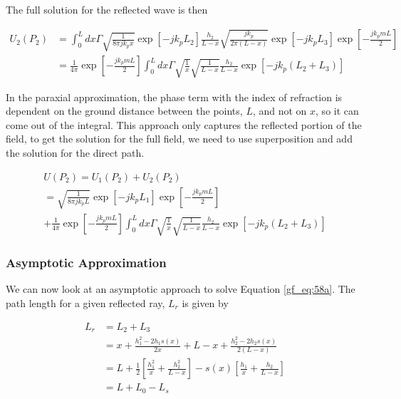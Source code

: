 \noindent The full solution for the reflected wave is then 

\begin{equation}
\begin{aligned}
U_2(P_2) &= \int_0^L dx \Gamma \sqrt{\frac{1}{8\pi j k_p x}}\exp[-jk_pL_2]\frac{h_2}{L-x}\sqrt{\frac{jk_p}{2\pi(L-x)}}\exp[-jk_pL_3]\exp\left[-\frac{jk_pmL}{2}\right]\\
&= \frac{1}{4\pi}\exp\left[-\frac{jk_pmL}{2}\right]\int_0^L dx \Gamma \sqrt{\frac{1}{x}}\sqrt{\frac{1}{L-x}}\frac{h_2}{L-x}\exp\left[-jk_p\left(L_2+L_3\right) \right]
\label{gf_eq:58}
\end{aligned}
\end{equation}
\renewcommand{\baselinestretch}{2} \small\normalsize

In the paraxial approximation, the phase term with the index of refraction is dependent on the ground distance between the points, $L$, and not on $x$, so it can come out of the integral. This approach only captures the reflected portion of the field, to get the solution for the full field, we need to use superposition and add the solution for the direct path.

\begin{equation}
\begin{gathered}
U(P_2) = U_1(P_2) + U_2(P_2)\\
= \sqrt{\frac{1}{8\pi jk_pL}}\exp\left[-jk_pL_1\right]\exp\left[-\frac{jk_pmL}{2}\right] \\
+ \frac{1}{4\pi}\exp\left[-\frac{jk_pmL}{2}\right]\int_0^L dx \Gamma \sqrt{\frac{1}{x}}\sqrt{\frac{1}{L-x}}\frac{h_2}{L-x}\exp\left[-jk_p\left(L_2+L_3\right) \right]
\label{gf_eq:58a}
\end{gathered}
\end{equation}
\renewcommand{\baselinestretch}{2} \small\normalsize

\subsubsection{Asymptotic Approximation}
We can now look at an asymptotic approach to solve Equation \ref{gf_eq:58a}. The path length for a given reflected ray, $L_r$ is given by

\begin{equation}
\begin{aligned}
L_r &= L_2 + L_3 \\
& = x + \frac{h_1^2-2h_1s(x)}{2x} +  L-x + \frac{h_2^2 - 2h_2s(x)}{2\left(L-x\right)} \\
& = L + \frac{1}{2}\left[\frac{h_1^2}{x} + \frac{h_2^2}{L-x} \right] - s(x)\left[ \frac{h_1}{x} + \frac{h_2}{L-x}\right] \\
&= L + L_0 - L_s
\end{aligned}
\label{gf_eq:60}
\end{equation}
\renewcommand{\baselinestretch}{2} \small\normalsize

